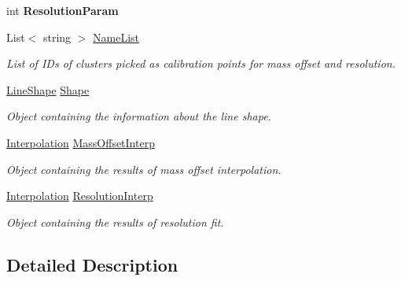\begin{DoxyCompactItemize}
int {\bfseries Resolution\+Param}
\item 
List$<$ string $>$ \mbox{\hyperlink{class_isotope_fit_1_1_i_f_data_1_1_calibration_a2e347f087df878f22010302bda7db4be}{Name\+List}}
\begin{DoxyCompactList}\small\item\em List of I\+Ds of clusters picked as calibration points for mass offset and resolution. \end{DoxyCompactList}\item 
\mbox{\hyperlink{class_isotope_fit_1_1_i_f_data_1_1_calibration_1_1_line_shape}{Line\+Shape}} \mbox{\hyperlink{class_isotope_fit_1_1_i_f_data_1_1_calibration_ad0c3e0969448ad0cc57307c77c2222eb}{Shape}}
\begin{DoxyCompactList}\small\item\em Object containing the information about the line shape. \end{DoxyCompactList}\item 
\mbox{\hyperlink{class_isotope_fit_1_1_interpolation}{Interpolation}} \mbox{\hyperlink{class_isotope_fit_1_1_i_f_data_1_1_calibration_af383c1c97a369e786e72ac5d79e8973e}{Mass\+Offset\+Interp}}
\begin{DoxyCompactList}\small\item\em Object containing the results of mass offset interpolation. \end{DoxyCompactList}\item 
\mbox{\hyperlink{class_isotope_fit_1_1_interpolation}{Interpolation}} \mbox{\hyperlink{class_isotope_fit_1_1_i_f_data_1_1_calibration_ab8db2fa10ee3de8f8deca251f4bd3518}{Resolution\+Interp}}
\begin{DoxyCompactList}\small\item\em Object containing the results of resolution fit. \end{DoxyCompactList}\end{DoxyCompactItemize}


\subsection{Detailed Description}


